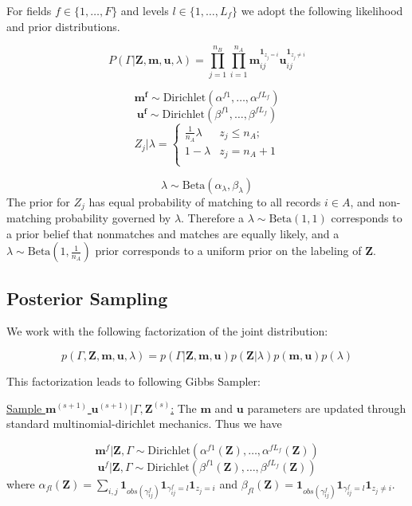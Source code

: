 \documentclass[
  12pt,
]{article}
\begin{document}
For fields \(f \in \{1, \ldots, F\}\) and levels
\(l\in \{1, \ldots, L_f\}\) we adopt the following likelihood and prior
distributions.

\[P(\Gamma|\mathbf{Z}, \mathbf{m}, \mathbf{u}, \lambda) =\prod_{j=1}^{n_B}  \prod_{i=1}^{n_A}\mathbf{m}_{ij}^{\mathbf{1}_{z_j = i}}\mathbf{u}_{ij}^{\mathbf{1}_{z_j \neq i}}\]

\[\mathbf{m^{f}} \sim \text{Dirichlet}(\alpha^{f1}, \ldots, \alpha^{fL_f})\]
\[\mathbf{u^{f}} \sim \text{Dirichlet}(\beta^{f1}, \ldots, \beta^{fL_f})\]
\[Z_j | \lambda =
\begin{cases} 
    \frac{1}{n_A}\lambda  & z_j \leq n_A; \\
     1-\lambda &  z_j  = n_A + 1 \\
\end{cases}\]

\[\lambda \sim \text{Beta}(\alpha_{\lambda}, \beta_{\lambda}) \] The
prior for \(Z_j\) has equal probability of matching to all records
\(i\in A\), and non-matching probability governed by \(\lambda\).
Therefore a \(\lambda \sim \text{Beta}(1, 1)\) corresponds to a prior
belief that nonmatches and matches are equally likely, and a
\(\lambda \sim \text{Beta}(1, \frac{1}{n_A})\) prior corresponds to a
uniform prior on the labeling of \(\mathbf{Z}\).

\hypertarget{posterior-sampling}{%
\subsection{Posterior Sampling}\label{posterior-sampling}}

We work with the following factorization of the joint distribution:

\[p(\Gamma, \mathbf{Z}, \mathbf{m}, \mathbf{u}, \lambda) = p(\Gamma|\mathbf{Z}, \mathbf{m}, \mathbf{u}) p(\mathbf{Z} | \lambda) p(\mathbf{m}, \mathbf{u}) p(\lambda)\]

This factorization leads to following Gibbs Sampler:

\underline{Sample $\mathbf{m}^{(s+1)}$ $\mathbf{u}^{(s+1)}|\Gamma, \mathbf{Z}^{(s)}$:}
The \(\mathbf{m}\) and \(\mathbf{u}\) parameters are updated through
standard multinomial-dirichlet mechanics. Thus we have

\[\mathbf{m}^f|\mathbf{Z}, \Gamma \sim \text{Dirichlet}(\alpha^{f1}(\mathbf{Z}), \ldots, \alpha^{fL_f}(\mathbf{Z}))\]
\[\mathbf{u}^f|\mathbf{Z}, \Gamma \sim \text{Dirichlet}(\beta^{f1}(\mathbf{Z}), \ldots, \beta^{fL_f}(\mathbf{Z}))\]
where
\(\alpha_{fl}(\mathbf{Z})= \sum_{i,j} \mathbf{1}_{obs(\gamma_{ij}^f)}\mathbf{1}_{\gamma_{ij}^f = l} \mathbf{1}_{z_j = i}\)
and
\(\beta_{fl}(\mathbf{Z})= \mathbf{1}_{obs(\gamma_{ij}^f)}\mathbf{1}_{\gamma_{ij}^f = l} \mathbf{1}_{z_j \neq i}\).
\end{document}
